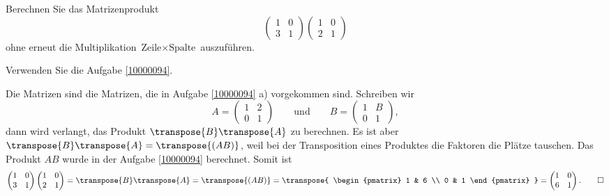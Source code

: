 Berechnen Sie das Matrizenprodukt
\[
\begin{pmatrix} 1 & 0 \\ 3 & 1 \end{pmatrix}
\begin{pmatrix} 1 & 0 \\ 2 & 1 \end{pmatrix}
\]
ohne erneut die Multiplikation $\text{Zeile} \times \text{Spalte}$
auszuführen.

\begin{hinweis}
Verwenden Sie die Aufgabe \ref{10000094}.
\end{hinweis}

\begin{loesung}
Die Matrizen sind die Matrizen, die in Aufgabe \ref{10000094} a) vorgekommen
sind.
Schreiben wir 
\[
A = \begin{pmatrix} 1 & 2 \\ 0 & 1 \end{pmatrix}
\qquad\text{und}\qquad
B = \begin{pmatrix} 1 & B \\ 0 & 1 \end{pmatrix},
\]
dann wird verlangt, das Produkt $\transpose{B}\transpose{A}$ zu berechnen.
Es ist aber
\(
\transpose{B}\transpose{A}
=
\transpose{(AB)}
\),
weil bei der Transposition eines Produktes die Faktoren die Plätze tauschen.
Das Produkt $AB$ wurde in der Aufgabe \ref{10000094} berechnet.
Somit ist
\[
\begin{pmatrix} 1 & 0 \\ 3 & 1 \end{pmatrix}
\begin{pmatrix} 1 & 0 \\ 2 & 1 \end{pmatrix}
=
\transpose{B}\transpose{A}
=
\transpose{(AB)}
=
\transpose{
\begin{pmatrix} 1 & 6 \\ 0 & 1 \end{pmatrix}
}
=
\begin{pmatrix} 1 & 0 \\ 6 & 1 \end{pmatrix}.
\qedhere
\]
\end{loesung}
